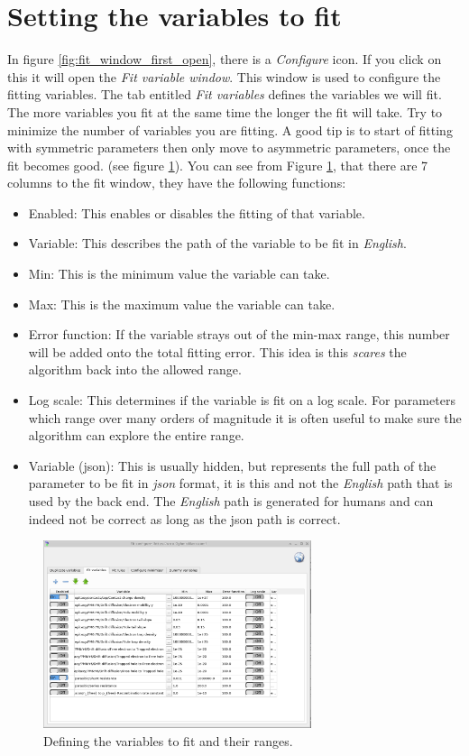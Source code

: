\section{Setting the variables to fit}
In figure \ref{fig:fit_window_first_open}, there is a \emph{Configure} icon. If you click on this it will open the \emph{Fit variable window}.  This window is used to configure the fitting variables. The tab entitled \emph{Fit variables} defines the variables we will fit.  The more variables you fit at the same time the longer the fit will take. Try to minimize the number of variables you are fitting. A good tip is to start of fitting with symmetric parameters then only move to asymmetric parameters, once the fit becomes good. (see figure \ref{fig:fit_vars}).  You can see from Figure \ref{fig:fit_vars}, that there are 7 columns to the fit window, they have the following functions:

\begin{itemize}
  \item Enabled: This enables or disables the fitting of that variable.
  \item Variable: This describes the path of the variable to be fit in \emph{English}.
  \item Min: This is the minimum value the variable can take.
  \item Max: This is the maximum value the variable can take.
  \item Error function: If the variable strays out of the min-max range, this number will be added onto the total fitting error. This idea is this \emph{scares} the algorithm back into the allowed range.
  \item Log scale: This determines if the variable is fit on a log scale. For parameters which range over many orders of magnitude it is often useful to make sure the algorithm can explore the entire range.
  \item Variable (json): This is usually hidden, but represents the full path of the parameter to be fit in  \emph{json} format, it is this and not the \emph{English} path that is used by the back end. The \emph{English} path is generated for humans and can indeed not be correct as long as the json path is correct. 
\end{itemize}

\begin{figure}[H]
\centering
\includegraphics[width=0.7\textwidth]{./images/fit/fit_vars.png}
\caption{Defining the variables to fit and their ranges.}
\label{fig:fit_vars}
\end{figure}

